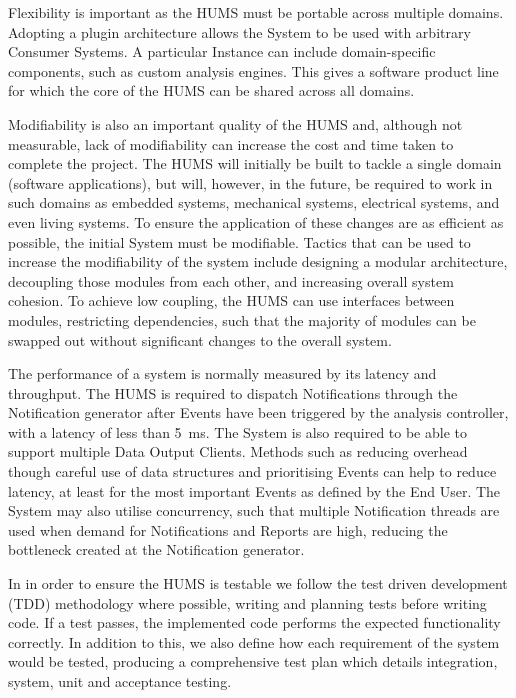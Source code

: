 \documentclass[10pt,a4paper]{article}
\begin{document}
Flexibility is important as the HUMS must be portable across multiple 
domains. Adopting a plugin architecture allows the System to be used with
arbitrary Consumer Systems. A particular Instance can include domain-specific components, such as custom analysis engines. This gives a software product line for which the core of the HUMS can be shared across all domains.

Modifiability is also an important quality of the HUMS and, although not 
measurable, lack of modifiability can increase the cost and time taken to 
complete the project. The HUMS will initially be built to tackle a single 
domain (software applications), but will, however, in the future, be required to
work in such domains as embedded systems, mechanical systems, electrical systems, and even living systems. To ensure the application of these changes are as efficient as possible, the initial System must be modifiable. Tactics that can be used to increase the modifiability of the system include designing a modular architecture, decoupling those modules from each other, and increasing overall system cohesion. To achieve low coupling, the HUMS can use interfaces between modules, restricting dependencies, such that the majority of modules can be swapped out without significant changes to the overall system.

The performance of a system is normally measured by its latency and 
throughput. The HUMS is required to dispatch Notifications through the 
Notification generator after Events have been triggered by the analysis 
controller, with a latency of less than 5~ms. The System is also required to be able to support multiple Data Output Clients. Methods such as reducing
overhead though careful use of data structures and prioritising Events can
help to reduce latency, at least for the most important Events as defined by the End User. The System may also utilise concurrency, such that multiple
Notification threads are used when demand for Notifications and Reports are high, reducing the bottleneck created at the Notification generator.

In in order to ensure the HUMS is testable we follow the test driven 
development (TDD) methodology where possible, writing and planning tests 
before writing code. If a test passes, the implemented code performs the 
expected functionality correctly. In addition to this, we also define how 
each requirement of the system would be tested, producing a 
comprehensive test plan which details integration, system, unit and 
acceptance testing.
\end{document}
